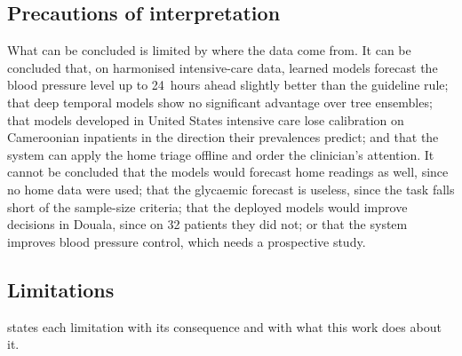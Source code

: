\subsection{Precautions of interpretation}\label{sec:precautions}

What can be concluded is limited by where the data come from. It can be concluded that, on harmonised intensive-care data, learned models forecast the blood pressure level up to 24~hours ahead slightly better than the guideline rule; that deep temporal models show no significant advantage over tree ensembles; that models developed in United States intensive care lose calibration on Cameroonian inpatients in the direction their prevalences predict; and that the system can apply the home triage offline and order the clinician's attention. It cannot be concluded that the models would forecast home readings as well, since no home data were used; that the glycaemic forecast is useless, since the task falls short of the sample-size criteria; that the deployed models would improve decisions in Douala, since on 32 patients they did not; or that the system improves blood pressure control, which needs a prospective study.

\subsection{Limitations}\label{sec:limitations}

 states each limitation with its consequence and with what this work does about it.

